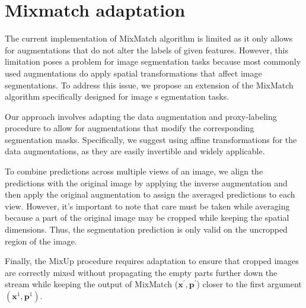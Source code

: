 \section{Mixmatch adaptation}
The current implementation of MixMatch algorithm is limited as it only allows for augmentations that do not alter the labels of given features. 
However, this limitation poses a problem for image segmentation tasks because most commonly used augmentations do apply spatial transformations 
that affect image segmentations. To address this issue, we propose an extension of the MixMatch algorithm specifically designed for image s
egmentation tasks.

Our approach involves adapting the data augmentation and proxy-labeling procedure to allow for augmentations that modify the corresponding 
segmentation masks. Specifically, we suggest using affine transformations for the data augmentations, as they are easily invertible and widely
applicable.

To combine predictions across multiple views of an image, we align the predictions with the original image by applying the inverse augmentation
and then apply the original augmentation to assign the averaged predictions to each view. However, it's important to note that care must be taken
while averaging because a part of the original image may be cropped while keeping the spatial dimensions. Thus, the segmentation prediction is 
only valid on the uncropped region of the image.

Finally, the MixUp procedure requires adaptation to ensure that cropped images are correctly mixed without propagating
the empty parts further down the stream while keeping the output of MixMatch ($\mathbf{x}^\prime,\mathbf{p}^\prime$) 
closer to the first argument $(\mathbf{x}^1,\mathbf{p}^1)$.

